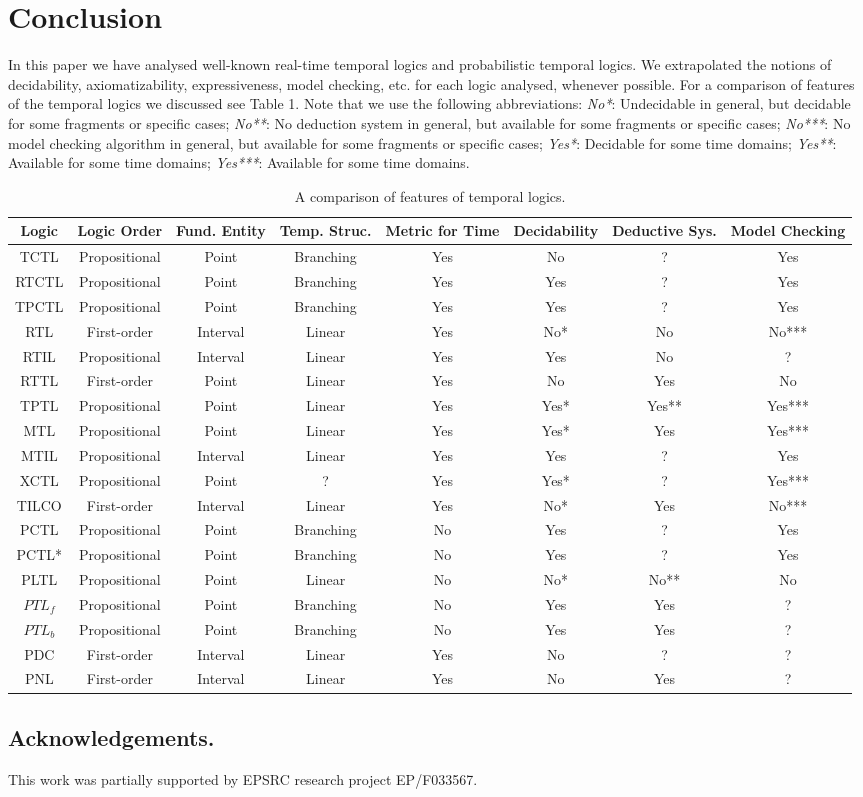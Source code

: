 \documentclass[11pt]{article}
\begin{document}
\section{Conclusion} \label{sec:conclusion}

In this paper we have analysed well-known real-time temporal logics and probabilistic temporal logics. We extrapolated the notions of decidability, axiomatizability, expressiveness, model checking, etc. for each logic analysed, whenever possible. For a comparison of features of the temporal logics we discussed see Table 1. Note that we use the following abbreviations: \emph{No*}: Undecidable in general, but decidable for some fragments or specific cases; \emph{No**}: No deduction system in general, but available for some fragments or specific cases; \emph{No***}: No model checking algorithm in general, but available for some fragments or specific cases; \emph{Yes*}: Decidable for some time domains; \emph{Yes**}:  Available for some time domains; \emph{Yes***}: Available for some time domains.


\begin{landscape}
\begin{table}
\caption{A comparison of features of temporal logics.}
\centering
\small
\begin{tabular}{|c|c|c|c|c|c|c|c|}
\hline
\textbf{Logic} & \textbf{Logic Order} & \textbf{Fund. Entity} & \textbf{Temp. Struc.} &\textbf{Metric for Time} & \textbf{Decidability} & \textbf{Deductive Sys.} & \textbf{Model Checking}\tabularnewline\hline\hline
TCTL&Propositional&Point&Branching&Yes&No&?&Yes\tabularnewline\hline
RTCTL&Propositional&Point&Branching&Yes&Yes&?&Yes\tabularnewline\hline
TPCTL&Propositional&Point&Branching&Yes&Yes&?&Yes\tabularnewline\hline\hline
RTL&First-order&Interval&Linear&Yes&No*&No&No***\tabularnewline\hline
RTIL&Propositional&Interval&Linear&Yes&Yes&No&?\tabularnewline\hline
RTTL&First-order&Point&Linear&Yes&No&Yes&No\tabularnewline\hline
TPTL&Propositional&Point&Linear&Yes&Yes*&Yes**&Yes***\tabularnewline\hline
MTL&Propositional&Point&Linear&Yes&Yes*&Yes&Yes***\tabularnewline\hline
MTIL&Propositional&Interval&Linear&Yes&Yes&?&Yes\tabularnewline\hline
XCTL&Propositional&Point&?&Yes&Yes*&?&Yes***\tabularnewline\hline
TILCO&First-order&Interval&Linear&Yes&No*&Yes&No***\tabularnewline\hline\hline
PCTL&Propositional&Point&Branching&No&Yes&?&Yes\tabularnewline\hline
PCTL*&Propositional&Point&Branching&No&Yes&?&Yes\tabularnewline\hline
PLTL&Propositional&Point&Linear&No&No*&No**&No\tabularnewline\hline
$PTL_{f}$&Propositional&Point&Branching&No&Yes&Yes&?\tabularnewline\hline
$PTL_{b}$&Propositional&Point&Branching&No&Yes&Yes&?\tabularnewline\hline
PDC&First-order&Interval&Linear&Yes&No&?&?\tabularnewline\hline
PNL&First-order&Interval&Linear&Yes&No&Yes&?\tabularnewline\hline\hline
\end{tabular}
\end{table}
\end{landscape}

\subsection*{Acknowledgements.}
This work was partially supported by EPSRC research project EP/F033567.

            
\end{document}
